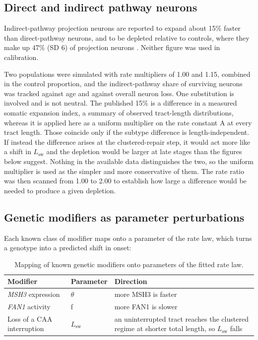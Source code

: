 \documentclass[conference]{IEEEtran}
\newlength{\colw}
\begin{document}
\subsection{Direct and indirect pathway neurons}
\label{sec:2.7}
Indirect-pathway projection neurons are reported to expand about 15\% faster than direct-pathway neurons, and to be depleted relative to controls, where they make up 47\% (SD 6) of projection neurons \cite{handsaker}. Neither figure was used in calibration.

Two populations were simulated with rate multipliers of 1.00 and 1.15, combined in the control proportion, and the indirect-pathway share of surviving neurons was tracked against age and against overall neuron loss. One substitution is involved and is not neutral. The published 15\% is a difference in a measured somatic expansion index, a summary of observed tract-length distributions, whereas it is applied here as a uniform multiplier on the rate constant A at every tract length. Those coincide only if the subtype difference is length-independent. If instead the difference arises at the clustered-repair step, it would act more like a shift in $L_{\mathrm{sw}}$ and the depletion would be larger at late stages than the figures below suggest. Nothing in the available data distinguishes the two, so the uniform multiplier is used as the simpler and more conservative of them. The rate ratio was then scanned from 1.00 to 2.00 to establish how large a difference would be needed to produce a given depletion.

\subsection{Genetic modifiers as parameter perturbations}
\label{sec:2.8}
Each known class of modifier maps onto a parameter of the rate law, which turns a genotype into a predicted shift in onset:

\begin{table}[!t]
\caption{Mapping of known genetic modifiers onto parameters of the fitted rate law.}
\label{tab:2}
\centering
\footnotesize
\setlength{\colw}{\dimexpr\textwidth-6\tabcolsep\relax}
\begin{tabular}{>{\raggedright\arraybackslash}p{0.208\colw}>{\raggedright\arraybackslash}p{0.072\colw}>{\raggedright\arraybackslash}p{0.720\colw}}
\toprule
\textbf{Modifier} & \textbf{Parameter} & \textbf{Direction} \\
\midrule
\textit{MSH3} expression & $\theta$ & more MSH3 is faster \\
\textit{FAN1} activity & f & more FAN1 is slower \\
Loss of a CAA interruption & $L_{\mathrm{sw}}$ & an uninterrupted tract reaches the clustered regime at shorter total length, so $L_{\mathrm{sw}}$ falls \\
\bottomrule
\end{tabular}
\end{table}
\end{document}

